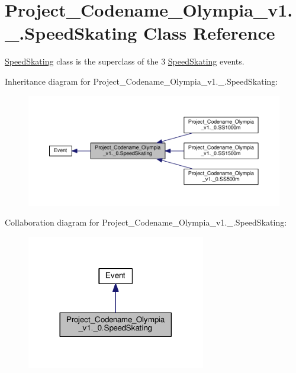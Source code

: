 \hypertarget{classProject__Codename__Olympia__v1_1_1__0_1_1SpeedSkating}{}\section{Project\+\_\+\+Codename\+\_\+\+Olympia\+\_\+v1.\+\_.\+Speed\+Skating Class Reference}
\label{classProject__Codename__Olympia__v1_1_1__0_1_1SpeedSkating}


\hyperlink{classProject__Codename__Olympia__v1_1_1__0_1_1SpeedSkating}{Speed\+Skating} class is the superclass of the 3 \hyperlink{classProject__Codename__Olympia__v1_1_1__0_1_1SpeedSkating}{Speed\+Skating} events.  




Inheritance diagram for Project\+\_\+\+Codename\+\_\+\+Olympia\+\_\+v1.\+\_.\+Speed\+Skating\+:
\nopagebreak
\begin{figure}[H]
\begin{center}
\leavevmode
\includegraphics[width=350pt]{classProject__Codename__Olympia__v1_1_1__0_1_1SpeedSkating__inherit__graph}
\end{center}
\end{figure}


Collaboration diagram for Project\+\_\+\+Codename\+\_\+\+Olympia\+\_\+v1.\+\_.\+Speed\+Skating\+:
\nopagebreak
\begin{figure}[H]
\begin{center}
\leavevmode
\includegraphics[width=221pt]{classProject__Codename__Olympia__v1_1_1__0_1_1SpeedSkating__coll__graph}
\end{center}
\end{figure}
